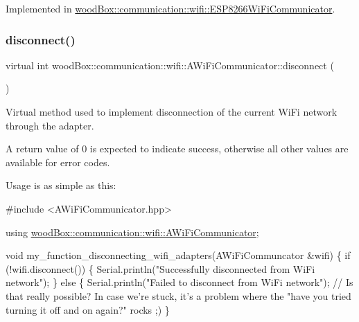 Implemented in \mbox{\hyperlink{classwood_box_1_1communication_1_1wifi_1_1_e_s_p8266_wi_fi_communicator_a0875cf7209c48069d22270eaeb2cac0f}{wood\+Box\+::communication\+::wifi\+::\+E\+S\+P8266\+Wi\+Fi\+Communicator}}.

\mbox{\label{classwood_box_1_1communication_1_1wifi_1_1_a_wi_fi_communicator_ae0be1e1dd1e0508bdd2f348f0052f6e6}} 
\subsubsection{\texorpdfstring{disconnect()}{disconnect()}}
{\footnotesize\ttfamily virtual int wood\+Box\+::communication\+::wifi\+::\+A\+Wi\+Fi\+Communicator\+::disconnect (\begin{DoxyParamCaption}{ }\end{DoxyParamCaption})\hspace{0.3cm}{\ttfamily [pure virtual]}}

Virtual method used to implement disconnection of the current Wi\+Fi network through the adapter.

A return value of 0 is expected to indicate success, otherwise all other values are available for error codes.

Usage is as simple as this\+:


\begin{DoxyCode}
\textcolor{preprocessor}{#include <AWiFiCommunicator.hpp>}

\textcolor{keyword}{using} \mbox{\hyperlink{classwood_box_1_1communication_1_1wifi_1_1_a_wi_fi_communicator}{woodBox::communication::wifi::AWiFiCommunicator}};

\textcolor{keywordtype}{void} my\_function\_disconnecting\_wifi\_adapters(AWiFiCommuncator &wifi) \{
  \textcolor{keywordflow}{if} (!wifi.disconnect()) \{
    Serial.println(\textcolor{stringliteral}{"Successfully disconnected from WiFi network"});
  \} \textcolor{keywordflow}{else} \{
    Serial.println(\textcolor{stringliteral}{"Failed to disconnect from WiFi network"}); \textcolor{comment}{// Is that really possible? In case we're
       stuck, it's a problem where the "have you tried turning it off and on again?" rocks ;)}
\}
\end{DoxyCode}
 

